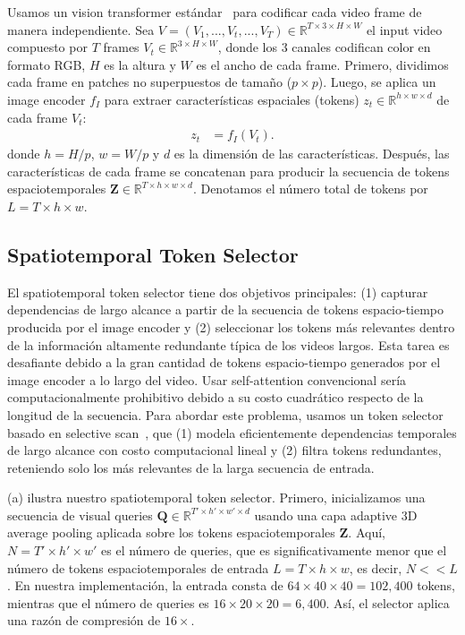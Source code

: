 Usamos un vision transformer estándar~\cite{dosovitskiy2020image} para codificar cada video frame de manera independiente. Sea $V = (V_1, ...,V_t, ..., V_T) \in\mathbb{R}^{T\times 3\times H\times W}$ el input video compuesto por $T$ frames $V_t\in\mathbb{R}^{3\times H\times W}$, donde los $3$ canales codifican color en formato RGB, $H$ es la altura y $W$ es el ancho de cada frame. Primero, dividimos cada frame en patches no superpuestos de tamaño ($p\times p$). Luego, se aplica un image encoder $f_I$ para extraer características espaciales (tokens) $z_t\in\mathbb{R}^{h \times w \times d}$ de cada frame $V_t$:
\begin{equation}
    \begin{aligned}
    z_t &= f_I(V_t).
    \end{aligned}
\end{equation} 
donde $h=H/p$, $w=W/p$ y $d$ es la dimensión de las características.
Después, las características de cada frame se concatenan para producir la secuencia de tokens espaciotemporales $\mathbf{Z}\in\mathbb{R}^{T \times h \times w \times d}$. Denotamos el número total de tokens por $L=T\times h \times w$.


\subsection{Spatiotemporal Token Selector}
\label{sec:token selector}

El spatiotemporal token selector tiene dos objetivos principales: (1) capturar dependencias de largo alcance a partir de la secuencia de tokens espacio-tiempo producida por el image encoder y (2) seleccionar los tokens más relevantes dentro de la información altamente redundante típica de los videos largos. Esta tarea es desafiante debido a la gran cantidad de tokens espacio-tiempo generados por el image encoder a lo largo del video. Usar self-attention convencional sería computacionalmente prohibitivo debido a su costo cuadrático respecto de la longitud de la secuencia. Para abordar este problema, usamos un token selector basado en selective scan~\cite{gu2023mamba}, que (1) modela eficientemente dependencias temporales de largo alcance con costo computacional lineal y (2) filtra tokens redundantes, reteniendo solo los más relevantes de la larga secuencia de entrada.


(a) ilustra nuestro spatiotemporal token selector. Primero, inicializamos una secuencia de visual queries $\mathbf{Q}\in\mathbb{R}^{T' \times h' \times w' \times d}$ usando una capa adaptive 3D average pooling aplicada sobre los tokens espaciotemporales $\mathbf{Z}$. Aquí, $N=T' \times h' \times w'$ es el número de queries, que es significativamente menor que el número de tokens espaciotemporales de entrada $L=T\times h \times w$, es decir, $N<<L$. En nuestra implementación, la entrada consta de $64 \times 40 \times 40=102,400$ tokens, mientras que el número de queries es $16 \times 20 \times 20=6,400$. Así, el selector aplica una razón de compresión de $16\times$.

